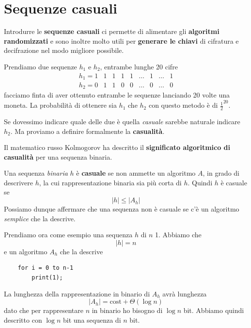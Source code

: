 \chapter{Sequenze casuali}\label{casualita}
Introdurre le \textbf{sequenze casuali} ci permette di alimentare gli \textbf{algoritmi randomizzati} e sono inoltre
molto utili per \textbf{generare le chiavi} di cifratura e decifrazione nel modo migliore possibile.

\begin{example}
	Prendiamo due sequenze $h_1$ e $h_2$, entrambe lunghe 20 cifre
	\[
		\begin{matrix}
			h_1 = 1 & 1 & 1 & 1 & 1 & \dots & 1 & \dots & 1 \\
			h_2 = 0 & 1 & 1 & 0 & 0 & \dots & 0 & \dots & 0
		\end{matrix}
	\]
	facciamo finta di aver ottenuto entrambe le sequenze lanciando 20 volte una moneta. La probabilit\`a di ottenere sia
	$h_1$ che $h_2$ con questo metodo \`e di $\frac{1}{2}^{20}$.

	Se dovessimo indicare quale delle due \`e quella \emph{casuale} sarebbe naturale indicare $h_2$. Ma proviamo a definire
	formalmente la \textbf{casualit\`a}.
\end{example}

Il matematico russo Kolmogorov ha descritto il \textbf{significato algoritmico di casualit\`a} per una sequenza binaria.

\begin{definition}[Kolmogorov]
	Una sequenza \emph{binaria} $h$ \`e \textbf{casuale} se non ammette un algoritmo $A$, in grado di descrivere $h$, la
	cui rappresentazione binaria sia pi\`u corta di $h$. Quindi $h$ \`e casuale se
	\[ |h| \leq |A_h| \]
	Possiamo dunque affermare che una sequenza non \`e casuale se c'\`e un algoritmo \emph{semplice} che la descrive.
\end{definition}

\begin{example}
	Prendiamo ora come esempio una sequenza $h$ di $n$ 1. Abbiamo che
	\[ |h| = n \]
	e un algoritmo $A_h$ che la descrive
	\begin{lstlisting}
	for i = 0 to n-1
		print(1);
	\end{lstlisting}
	La lunghezza della rappresentazione in binario di $A_h$ avr\`a lunghezza
	\[ |A_h| = \text{cost} + \Theta(\log n) \]
	dato che per rappresentare $n$ in binario ho bisogno di $\log n$ bit. Abbiamo quindi descritto con $\log n$	bit
	una sequenza di $n$ bit.
\end{example}

